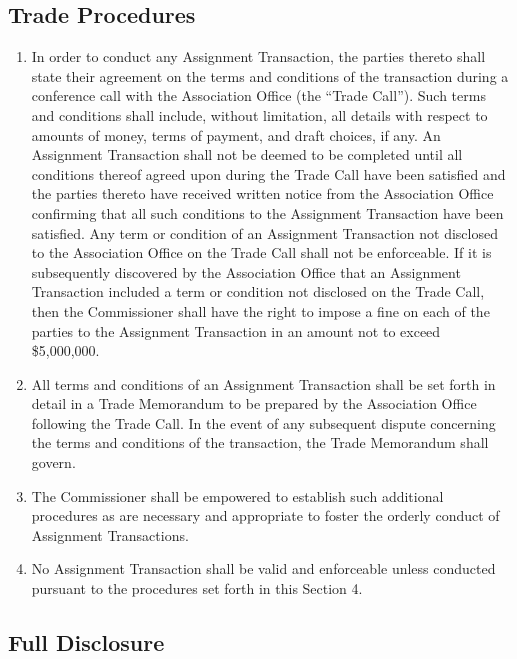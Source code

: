 \documentclass[]{book}
\providecommand{\tightlist}{%
  \setlength{\itemsep}{0pt}\setlength{\parskip}{0pt}}
\theoremstyle{definition}
\theoremstyle{definition}
\theoremstyle{definition}
\theoremstyle{remark}
\begin{document}
\subsection{Trade Procedures}\label{trade-procedures}

\begin{enumerate}
\def\labelenumi{(\alph{enumi})}
\tightlist
\item
  In order to conduct any Assignment Transaction, the parties thereto
  shall state their agreement on the terms and conditions of the
  transaction during a conference call with the Association Office (the
  ``Trade Call''). Such terms and conditions shall include, without
  limitation, all details with respect to amounts of money, terms of
  payment, and draft choices, if any. An Assignment Transaction shall
  not be deemed to be completed until all conditions thereof agreed upon
  during the Trade Call have been satisfied and the parties thereto have
  received written notice from the Association Office confirming that
  all such conditions to the Assignment Transaction have been satisfied.
  Any term or condition of an Assignment Transaction not disclosed to
  the Association Office on the Trade Call shall not be enforceable. If
  it is subsequently discovered by the Association Office that an
  Assignment Transaction included a term or condition not disclosed on
  the Trade Call, then the Commissioner shall have the right to impose a
  fine on each of the parties to the Assignment Transaction in an amount
  not to exceed \$5,000,000.
\item
  All terms and conditions of an Assignment Transaction shall be set
  forth in detail in a Trade Memorandum to be prepared by the
  Association Office following the Trade Call. In the event of any
  subsequent dispute concerning the terms and conditions of the
  transaction, the Trade Memorandum shall govern.
\item
  The Commissioner shall be empowered to establish such additional
  procedures as are necessary and appropriate to foster the orderly
  conduct of Assignment Transactions.
\item
  No Assignment Transaction shall be valid and enforceable unless
  conducted pursuant to the procedures set forth in this Section 4.
\end{enumerate}

\subsection{Full Disclosure}\label{full-disclosure}
\end{document}

